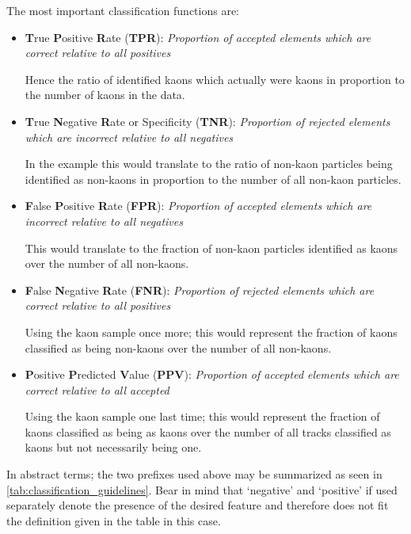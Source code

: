The most important classification functions are:
\begin{itemize}
	\item \textbf{T}rue \textbf{P}ositive \textbf{R}ate (\textbf{TPR}): \textit{Proportion of accepted elements which are correct relative to all positives}

	\nobreak
	Hence the ratio of identified kaons which actually were kaons in proportion to the number of kaons in the data.

	\item \textbf{T}rue \textbf{N}egative \textbf{R}ate or Specificity (\textbf{TNR}): \textit{Proportion of rejected elements which are incorrect relative to all negatives}

	\nobreak
	In the example this would translate to the ratio of non-kaon particles being identified as non-kaons in proportion to the number of all non-kaon particles.

	\item \textbf{F}alse \textbf{P}ositive \textbf{R}ate (\textbf{FPR}): \textit{Proportion of accepted elements which are incorrect relative to all negatives}

	\nobreak
	This would translate to the fraction of non-kaon particles identified as kaons over the number of all non-kaons.

	\item \textbf{F}alse \textbf{N}egative \textbf{R}ate (\textbf{FNR}): \textit{Proportion of rejected elements which are correct relative to all positives}

	\nobreak
	Using the kaon sample once more; this would represent the fraction of kaons classified as being non-kaons over the number of all non-kaons.

	\item \textbf{P}ositive \textbf{P}redicted \textbf{V}alue (\textbf{PPV}): \textit{Proportion of accepted elements which are correct relative to all accepted}

	\nobreak
	Using the kaon sample one last time; this would represent the fraction of kaons classified as being as kaons over the number of all tracks classified as kaons but not necessarily being one.

\end{itemize}

In abstract terms; the two prefixes used above may be summarized as seen in \autoref{tab:classification_guidelines}. Bear in mind that `negative' and `positive' if used separately denote the presence of the desired feature and therefore does not fit the definition given in the table in this case.

